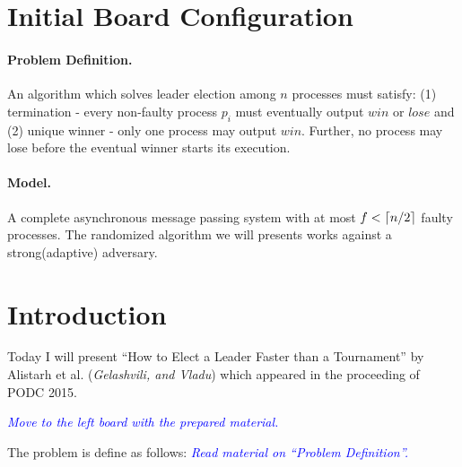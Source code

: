 \documentclass[
10pt, %
letterpaper, %
onecolumn, %
]{article}
\begin{document}
\pagestyle{myheadings} %
\markright{\doctitle} %


\thispagestyle{plain} %

\printtitle %


\section{Initial Board Configuration}
\paragraph{Problem Definition.} An algorithm which solves leader election among $n$ processes must satisfy: (1) termination - every non-faulty process $p_i$ must eventually output $win$ or $lose$ and (2) unique winner - only one process may output $win$. Further, no process may lose before the eventual winner starts its execution. 

\paragraph{Model.} A complete asynchronous message passing system with at most $f < \lceil n/2\rceil$ faulty processes. The randomized algorithm we will presents works against a strong(adaptive) adversary. 


\section{Introduction}
Today I will present ``How to Elect a Leader Faster than a Tournament'' by Alistarh et al. (\emph{Gelashvili, and Vladu}) which appeared in the proceeding of PODC 2015. 

\textcolor{blue}{\emph{Move to the left board with the prepared material.}}

The problem is define as follows:
\textcolor{blue}{\emph{Read material on ``Problem Definition''.}}
\end{document}

